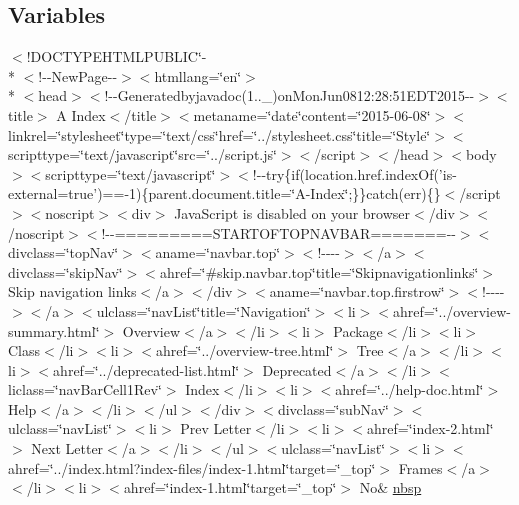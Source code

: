 \subsection*{Variables}
\begin{DoxyCompactItemize}
\item 
$<$!D\-O\-C\-T\-Y\-P\-E\-H\-T\-M\-L\-P\-U\-B\-L\-I\-C\char`\"{}-\/\\*
$<$!-\/-\/New\-Page-\/-\/$>$$<$htmllang=\char`\"{}en\char`\"{}$>$\\*
$<$head$>$$<$!-\/-\/Generatedbyjavadoc(1..\-\_)on\-Mon\-Jun0812\-:28\-:51\-E\-D\-T2015-\/-\/$>$$<$title$>$ A Index$<$/title$>$$<$metaname=\char`\"{}date\char`\"{}content=\char`\"{}2015-\/06-\/08\char`\"{}$>$$<$linkrel=\char`\"{}stylesheet\char`\"{}type=\char`\"{}text/css\char`\"{}href=\char`\"{}../stylesheet.\-css\char`\"{}title=\char`\"{}\-Style\char`\"{}$>$$<$scripttype=\char`\"{}text/javascript\char`\"{}src=\char`\"{}../script.\-js\char`\"{}$>$$<$/script$>$$<$/head$>$$<$body$>$$<$scripttype=\char`\"{}text/javascript\char`\"{}$>$$<$!-\/-\/try\{if(location.\-href.\-index\-Of('is-\/external=true')==-\/1)\{parent.\-document.\-title=\char`\"{}\-A-\/\-Index\char`\"{};\}\}catch(err)\{\}$<$/script$>$$<$noscript$>$$<$div$>$ Java\-Script is disabled on your browser$<$/div$>$$<$/noscript$>$$<$!-\/-\/=========\-S\-T\-A\-R\-T\-O\-F\-T\-O\-P\-N\-A\-V\-B\-A\-R=======-\/-\/$>$$<$divclass=\char`\"{}top\-Nav\char`\"{}$>$$<$aname=\char`\"{}navbar.\-top\char`\"{}$>$$<$!-\/-\/-\/-\/$>$$<$/a$>$$<$divclass=\char`\"{}skip\-Nav\char`\"{}$>$$<$ahref=\char`\"{}\#skip.\-navbar.\-top\char`\"{}title=\char`\"{}\-Skipnavigationlinks\char`\"{}$>$ Skip navigation links$<$/a$>$$<$/div$>$$<$aname=\char`\"{}navbar.\-top.\-firstrow\char`\"{}$>$$<$!-\/-\/-\/-\/$>$$<$/a$>$$<$ulclass=\char`\"{}nav\-List\char`\"{}title=\char`\"{}\-Navigation\char`\"{}$>$$<$li$>$$<$ahref=\char`\"{}../overview-\/summary.\-html\char`\"{}$>$ Overview$<$/a$>$$<$/li$>$$<$li$>$ Package$<$/li$>$$<$li$>$ Class$<$/li$>$$<$li$>$$<$ahref=\char`\"{}../overview-\/tree.\-html\char`\"{}$>$ Tree$<$/a$>$$<$/li$>$$<$li$>$$<$ahref=\char`\"{}../deprecated-\/list.\-html\char`\"{}$>$ Deprecated$<$/a$>$$<$/li$>$$<$liclass=\char`\"{}nav\-Bar\-Cell1\-Rev\char`\"{}$>$ Index$<$/li$>$$<$li$>$$<$ahref=\char`\"{}../help-\/doc.\-html\char`\"{}$>$ Help$<$/a$>$$<$/li$>$$<$/ul$>$$<$/div$>$$<$divclass=\char`\"{}sub\-Nav\char`\"{}$>$$<$ulclass=\char`\"{}nav\-List\char`\"{}$>$$<$li$>$ Prev Letter$<$/li$>$$<$li$>$$<$ahref=\char`\"{}index-\/2.\-html\char`\"{}$>$ Next Letter$<$/a$>$$<$/li$>$$<$/ul$>$$<$ulclass=\char`\"{}nav\-List\char`\"{}$>$$<$li$>$$<$ahref=\char`\"{}../index.\-html?index-\/files/index-\/1.\-html\char`\"{}target=\char`\"{}\-\_\-top\char`\"{}$>$ Frames$<$/a$>$$<$/li$>$$<$li$>$$<$ahref=\char`\"{}index-\/1.\-html\char`\"{}target=\char`\"{}\-\_\-top\char`\"{}$>$ No\& \hyperlink{index-1_8html_a479d00f21dbca369efe3be97f1ef785a}{nbsp}

\end{DoxyCompactItemize}
